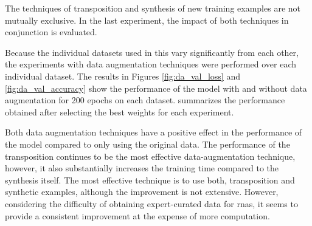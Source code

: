 
The techniques of transposition and synthesis of new
training examples are not mutually exclusive. In the last
experiment, the impact of both techniques in conjunction is
evaluated.

Because the individual datasets used in this \thesisdiss{}
vary significantly from each other, the experiments with
data augmentation techniques were performed over each
individual dataset. The results in Figures
\ref{fig:da_val_loss} and \ref{fig:da_val_accuracy} show the
performance of the model with and without data augmentation
for 200 epochs on each dataset. 
summarizes the performance obtained after selecting the best
weights for each experiment.




 Both data augmentation techniques have a positive effect in
 the performance of the model compared to only using the
 original data. The performance of the transposition
 continues to be the most effective data-augmentation
 technique, however, it also substantially increases the
 training time compared to the synthesis itself. The most
 effective technique is to use both, transposition and
 synthetic examples, although the improvement is not
 extensive. However, considering the difficulty of obtaining
 expert-curated data for \glspl{rna}, it seems to provide a
 consistent improvement at the expense of more computation.
